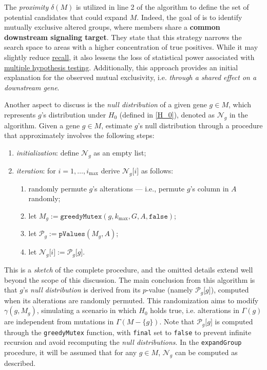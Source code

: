 The \textit{proximity} $\delta(M)$ is utilized in line 2 of the algorithm to define the set of potential candidates that could expand $M$. Indeed, the goal of \textcite{mutex} is to identify mutually exclusive altered groups, where members share a \textbf{common downstream signaling target}. They state that this strategy narrows the search space to areas with a higher concentration of true positives. While it may slightly reduce \href{https://en.wikipedia.org/wiki/Precision_and_recall}{recall}, it also lessens the loss of statistical power associated with \href{https://en.wikipedia.org/wiki/Multiple_comparisons_problem}{multiple hypothesis testing}. Additionally, this approach provides an initial explanation for the observed mutual exclusivity, i.e. \textit{through a shared effect on a downstream gene}.

Another aspect to discuss is the \textit{null distribution} of a given gene $g \in M$, which represents $g$'s distribution under $H_0$ (defined in \cref{H_0}), denoted as $\mathcal N_g$ in the algorithm. Given a gene $g \in M$, \textcite{mutex} estimate $g$'s null distribution through a procedure that approximately involves the following steps:

\begin{enumerate}
    \item \textit{initialization}: define $\mathcal N_g$ as an empty list;
    \item \textit{iteration}: for $i = 1, \ldots, i_\mathrm{max}$ derive $\mathcal N_g \texttt{[}i\texttt{]}$ as follows:

        \begin{enumerate}
            \item randomly permute $g$'s alterations --- i.e., permute $g$'s column in $A$ randomly;
            \item let $M_g := \texttt{greedyMutex}(g, k_\mathrm{max}, G, A, \texttt{false})$;
            \item let $\mathcal P_g := \texttt{pValues}(M_g, A)$;
            \item let $\mathcal N_g \texttt{[}i\texttt{]} := \mathcal P_g\texttt{[}g\texttt{]}$.
        \end{enumerate}
\end{enumerate}

This is a \textit{sketch} of the complete procedure, and the omitted details extend well beyond the scope of this discussion. The main conclusion from this algorithm is that $g$'s \textit{null distribution} is derived from its $p$-value (namely $\mathcal P_g\texttt{[}g\texttt{]}$), computed when its alterations are randomly permuted. This randomization aims to modify $\gamma(g, M_g)$, simulating a scenario in which $H_0$ holds true, i.e. alterations in $\Gamma(g)$ are independent from mutations in $\Gamma(M - \{g\})$. Note that $\mathcal P_g\texttt{[}g\texttt{]}$ is computed through the \texttt{greedyMutex} function, with \texttt{final} set to \texttt{false} to prevent infinite recursion and avoid recomputing the \textit{null distributions}. In the \texttt{expandGroup} procedure, it will be assumed that for any $g \in M$, $\mathcal N_g$ can be computed as described.

